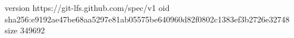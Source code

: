 version https://git-lfs.github.com/spec/v1
oid sha256:e9192ae47be68aa5297e81ab05575be640960d82f0802c1383ef3b2726e32748
size 349692
